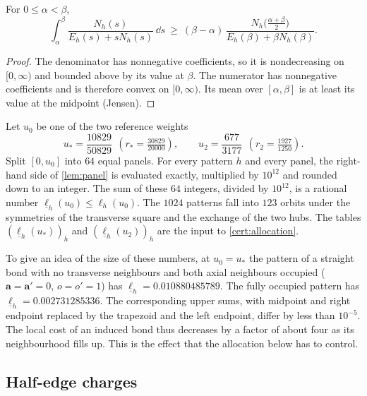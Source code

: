 \begin{lemma}\label{lem:panel}
For $0\le\alpha<\beta$,
\[
 \int_\alpha^\beta\frac{N_h(s)}{E_h(s)+sN_h(s)}\,\dd s\ \ge\ (\beta-\alpha)\,\frac{N_h\bigl(\tfrac{\alpha+\beta}2\bigr)}{E_h(\beta)+\beta N_h(\beta)} .
\]
\end{lemma}

\begin{proof}
The denominator has nonnegative coefficients, so it is nondecreasing on $[0,\infty)$ and bounded above by its value at $\beta$. The numerator has nonnegative coefficients and is therefore convex on $[0,\infty)$. Its mean over $[\alpha,\beta]$ is at least its value at the midpoint (Jensen).
\end{proof}

\begin{certificate}\label{cert:prism}
Let $u_0$ be one of the two reference weights
\[
 u_*=\frac{10829}{50829}\ \ (r_*=\tfrac{30829}{20000}),\qquad u_2=\frac{677}{3177}\ \ (r_2=\tfrac{1927}{1250}).
\]
Split $[0,u_0]$ into $64$ equal panels. For every pattern $h$ and every panel, the right-hand side of \cref{lem:panel} is evaluated exactly, multiplied by $10^{12}$ and rounded down to an integer. The sum of these $64$ integers, divided by $10^{12}$, is a rational number $\underline\ell_h(u_0)\le\ell_h(u_0)$. The $1024$ patterns fall into $123$ orbits under the symmetries of the transverse square and the exchange of the two hubs. The tables $(\underline\ell_h(u_*))_h$ and $(\underline\ell_h(u_2))_h$ are the input to \cref{cert:allocation}.
\end{certificate}

To give an idea of the size of these numbers, at $u_0=u_*$ the pattern of a straight bond with no transverse neighbours and both axial neighbours occupied ($\mathbf a=\mathbf a'=0$, $o=o'=1$) has $\underline\ell_h=0.010880485789$. The fully occupied pattern has $\underline\ell_h=0.002731285336$. The corresponding upper sums, with midpoint and right endpoint replaced by the trapezoid and the left endpoint, differ by less than $10^{-5}$. The local cost of an induced bond thus decreases by a factor of about four as its neighbourhood fills up. This is the effect that the allocation below has to control.

\subsection{Half-edge charges}

